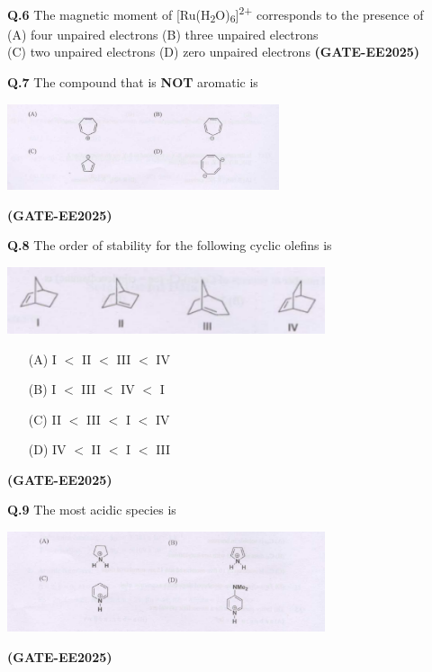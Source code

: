 \documentclass[12pt]{article}
\begin{document}
\begin{enumerate}
    \vspace{0.5cm}

    \textbf{Q.6} The magnetic moment of [Ru(H\textsubscript{2}O)\textsubscript{6}]\textsuperscript{2+} corresponds to the presence of\\
    (A) four unpaired electrons \quad
    (B) three unpaired electrons\\
    (C) two unpaired electrons \quad
    (D) zero unpaired electrons   \textbf{(GATE-EE2025)}


    \vspace{0.5cm}

\textbf{Q.7} \quad The compound that is \textbf{NOT} aromatic is

\begin{center}
  \includegraphics[width=0.6\textwidth]{figs/q7.png} 
\end{center}

\bigskip
   \textbf{(GATE-EE2025)}


\textbf{Q.8} The order of stability for the following cyclic olefins is

\begin{center}
  \includegraphics[width=0.7\textwidth]{figs/q8.png} 
\end{center}

\begin{itemize}
  \item[(A)] I \(<\) II \(<\) III \(<\) IV
  \item[(B)] I \(<\) III \(<\) IV \(<\) I
  \item[(C)] II \(<\) III \(<\) I \(<\) IV
  \item[(D)] IV \(<\) II \(<\) I \(<\) III
\end{itemize}   \textbf{(GATE-EE2025)}


\textbf{Q.9} The most acidic species is

\begin{center}
  \includegraphics[width=0.7\textwidth]{figs/q9.png} 
\end{center}   \textbf{(GATE-EE2025)}



\end{enumerate}
\end{document}
